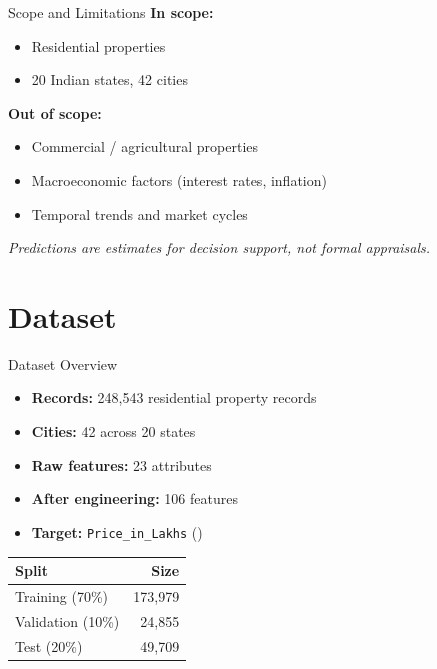 \documentclass[aspectratio=169, 12pt]{beamer}
\begin{document}
\begin{frame}{Scope and Limitations}
  \textbf{In scope:}
  \begin{itemize}
    \item Residential properties
    \item 20 Indian states, 42 cities
  \end{itemize}

  \textbf{Out of scope:}
  \begin{itemize}
    \item Commercial / agricultural properties
    \item Macroeconomic factors (interest rates, inflation)
    \item Temporal trends and market cycles
  \end{itemize}

  \medskip
  \emph{Predictions are estimates for decision support, not formal appraisals.}
\end{frame}

\section{Dataset}

\begin{frame}{Dataset Overview}
  \begin{itemize}
    \item \textbf{Records:} 248,543 residential property records
    \item \textbf{Cities:} 42 across 20 states
    \item \textbf{Raw features:} 23 attributes
    \item \textbf{After engineering:} 106 features
    \item \textbf{Target:} \texttt{Price\_in\_Lakhs} (\textrupee)
  \end{itemize}

  \medskip
  \begin{center}
    \begin{tabular}{lr}
      \toprule
      Split & Size \\
      \midrule
      Training (70\%) & 173,979 \\
      Validation (10\%) & 24,855 \\
      Test (20\%) & 49,709 \\
      \bottomrule
    \end{tabular}
  \end{center}
\end{frame}
\end{document}
